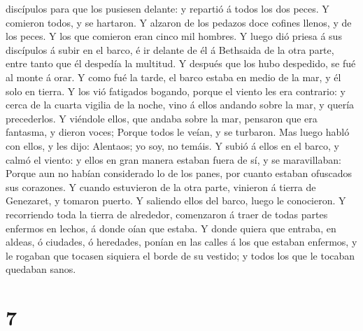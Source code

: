 discípulos para que los pusiesen delante: y repartió á todos los dos
peces.  Y comieron todos, y se hartaron.  Y
alzaron de los pedazos doce cofines llenos, y de los peces.
 Y los que comieron eran cinco mil hombres.  Y
luego dió priesa á sus discípulos á subir en el barco, é ir delante de
él á Bethsaida de la otra parte, entre tanto que él despedía la
multitud.  Y después que los hubo despedido, se fué al
monte á orar.  Y como fué la tarde, el barco estaba en
medio de la mar, y él solo en tierra.  Y los vió fatigados
bogando, porque el viento les era contrario: y cerca de la cuarta
vigilia de la noche, vino á ellos andando sobre la mar, y quería
precederlos.  Y viéndole ellos, que andaba sobre la mar,
pensaron que era fantasma, y dieron voces;  Porque todos le
veían, y se turbaron. Mas luego habló con ellos, y les dijo: Alentaos;
yo soy, no temáis.  Y subió á ellos en el barco, y calmó el
viento: y ellos en gran manera estaban fuera de sí, y se maravillaban:
 Porque aun no habían considerado lo de los panes, por
cuanto estaban ofuscados sus corazones.  Y cuando
estuvieron de la otra parte, vinieron á tierra de Genezaret, y tomaron
puerto.  Y saliendo ellos del barco, luego le conocieron.
 Y recorriendo toda la tierra de alrededor, comenzaron á
traer de todas partes enfermos en lechos, á donde oían que estaba.
 Y donde quiera que entraba, en aldeas, ó ciudades, ó
heredades, ponían en las calles á los que estaban enfermos, y le rogaban
que tocasen siquiera el borde de su vestido; y todos los que le tocaban
quedaban sanos.

\hypertarget{section-6}{%
\section{7}\label{section-6}}

